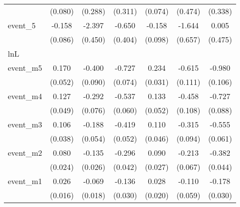 {\begin{tabular}{l*{6}{c}}
            &     (0.080)         &     (0.288)         &     (0.311)         &     (0.074)         &     (0.474)         &     (0.338)         \\
[1em]
event\_5     &      -0.158         &      -2.397\sym{***}&      -0.650         &      -0.158         &      -1.644\sym{*}  &       0.005         \\
            &     (0.086)         &     (0.450)         &     (0.404)         &     (0.098)         &     (0.657)         &     (0.475)         \\
\hline
lnL         &                     &                     &                     &                     &                     &                     \\
event\_m5    &       0.170\sym{**} &      -0.400\sym{***}&      -0.727\sym{***}&       0.234\sym{***}&      -0.615\sym{***}&      -0.980\sym{***}\\
            &     (0.052)         &     (0.090)         &     (0.074)         &     (0.031)         &     (0.111)         &     (0.106)         \\
[1em]
event\_m4    &       0.127\sym{**} &      -0.292\sym{***}&      -0.537\sym{***}&       0.133\sym{*}  &      -0.458\sym{***}&      -0.727\sym{***}\\
            &     (0.049)         &     (0.076)         &     (0.060)         &     (0.052)         &     (0.108)         &     (0.088)         \\
[1em]
event\_m3    &       0.106\sym{**} &      -0.188\sym{***}&      -0.419\sym{***}&       0.110\sym{*}  &      -0.315\sym{***}&      -0.555\sym{***}\\
            &     (0.038)         &     (0.054)         &     (0.052)         &     (0.046)         &     (0.094)         &     (0.061)         \\
[1em]
event\_m2    &       0.080\sym{**} &      -0.135\sym{***}&      -0.296\sym{***}&       0.090\sym{***}&      -0.213\sym{**} &      -0.382\sym{***}\\
            &     (0.024)         &     (0.026)         &     (0.042)         &     (0.027)         &     (0.067)         &     (0.044)         \\
[1em]
event\_m1    &       0.026         &      -0.069\sym{***}&      -0.136\sym{***}&       0.028         &      -0.110         &      -0.178\sym{***}\\
            &     (0.016)         &     (0.018)         &     (0.030)         &     (0.020)         &     (0.059)         &     (0.030)         \\

\end{tabular}}
